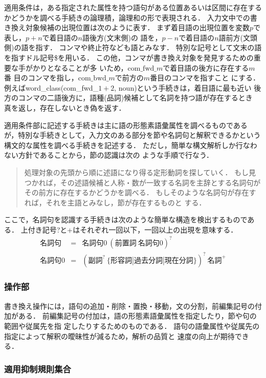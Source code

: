 適用条件は，ある指定された属性を持つ語句がある位置あるいは区間に存在する
かどうかを調べる手続きの論理積，論理和の形で表現される．
入力文中での書き換え対象候補の出現位置は次のように表す．
まず着目語の出現位置を変数$p$で表し，$p+n$で着目語の$n$語後方(文末側)の
語を，$p-n$で着目語の$n$語前方(文頭側)の語を指す．
コンマや終止符なども語とみなす．
特別な記号として文末の語を指すドル記号\$を用いる．
この他，コンマが書き換え対象を発見するための重要な手がかりとなることが多
い\cite{Jones94}ため，$\mbox{com\_fwd\_}m$で着目語の後方に存在する$m$番
目のコンマを指し，$\mbox{com\_bwd\_}m$で前方の$m$番目のコンマを指すこと
にする．
例えばword\_class(com\_fwd\_$1+2$, noun)という手続きは，着目語に最も近い
後方のコンマの二語後方に，語種(品詞)候補として名詞を持つ語が存在するとき
真を返し，存在しないとき偽を返す．

適用条件部に記述する手続きは主に語の形態素語彙属性を調べるものである
が，特別な手続きとして，入力文のある部分を節や名詞句と解釈できるかという
構文的な属性を調べる手続きを記述する．
ただし，簡単な構文解析しか行なわない方針であることから，節の認識は次の
ような手順で行なう．
\begin{quote}
処理対象の先頭から順に述語になり得る定形動詞を探していく．
もし見つかれば，その述語候補と人称・数が一致する名詞を主辞とする名詞句が
その前方に存在するかどうかを調べる．
もしそのような名詞句が存在すれば，それを主語とみなし，節が存在するものと
する．
\end{quote}
ここで，名詞句を認識する手続きは次のような簡単な構造を検出するものであ
る．
上付き記号?と+はそれぞれ一回以下，一回以上の出現を意味する．
\begin{eqnarray*}
名詞句  &=& 名詞句0\ (前置詞\ 名詞句0)^? \\
名詞句0 &=& (副詞^?\ \{形容詞|過去分詞|現在分詞\})^?\ \mbox{名詞}^+
\end{eqnarray*}

\subsubsection{操作部}
\label{sec:preedit:ruleformat:action}

書き換え操作には，語句の追加・削除・置換・移動，文の分割，前編集記号の付
加がある．
前編集記号の付加は，語の形態素語彙属性を指定したり，節や句の範囲や従属先を指
定したりするためのものである．
語句の語彙属性や従属先の指定によって解釈の曖昧性が減るため，解析の品質と
速度の向上が期待できる．

\subsubsection{適用抑制規則集合}

